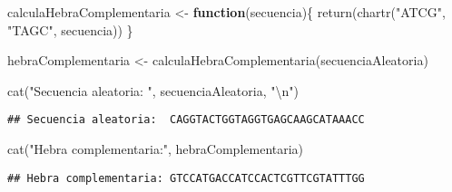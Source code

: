\documentclass[
]{article}
\newenvironment{Shaded}{\begin{snugshade}}{\end{snugshade}}
\newcommand{\ControlFlowTok}[1]{\textcolor[rgb]{0.13,0.29,0.53}{\textbf{#1}}}
\newcommand{\FunctionTok}[1]{\textcolor[rgb]{0.00,0.00,0.00}{#1}}
\newcommand{\NormalTok}[1]{#1}
\newcommand{\OtherTok}[1]{\textcolor[rgb]{0.56,0.35,0.01}{#1}}
\newcommand{\SpecialCharTok}[1]{\textcolor[rgb]{0.00,0.00,0.00}{#1}}
\newcommand{\StringTok}[1]{\textcolor[rgb]{0.31,0.60,0.02}{#1}}
\begin{document}
\begin{Shaded}
\begin{Highlighting}[]
\NormalTok{calculaHebraComplementaria }\OtherTok{\textless{}{-}} \ControlFlowTok{function}\NormalTok{(secuencia)\{}
  \FunctionTok{return}\NormalTok{(}\FunctionTok{chartr}\NormalTok{(}\StringTok{"ATCG"}\NormalTok{, }\StringTok{"TAGC"}\NormalTok{, secuencia))}
\NormalTok{\}}

\NormalTok{hebraComplementaria }\OtherTok{\textless{}{-}} \FunctionTok{calculaHebraComplementaria}\NormalTok{(secuenciaAleatoria)}

\FunctionTok{cat}\NormalTok{(}\StringTok{"Secuencia aleatoria: "}\NormalTok{, secuenciaAleatoria, }\StringTok{"}\SpecialCharTok{\textbackslash{}n}\StringTok{"}\NormalTok{)}
\end{Highlighting}
\end{Shaded}

\begin{verbatim}
## Secuencia aleatoria:  CAGGTACTGGTAGGTGAGCAAGCATAAACC
\end{verbatim}

\begin{Shaded}
\begin{Highlighting}[]
\FunctionTok{cat}\NormalTok{(}\StringTok{"Hebra complementaria:"}\NormalTok{, hebraComplementaria)}
\end{Highlighting}
\end{Shaded}

\begin{verbatim}
## Hebra complementaria: GTCCATGACCATCCACTCGTTCGTATTTGG
\end{verbatim}
\end{document}
